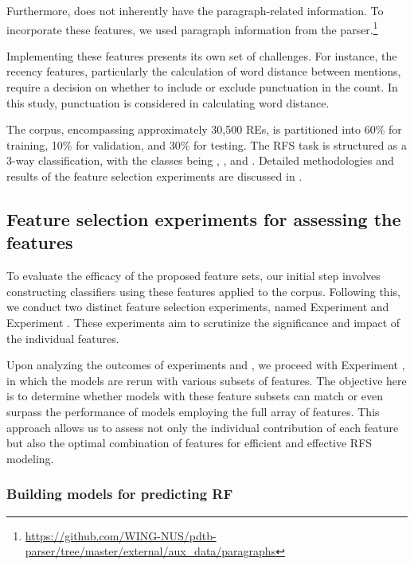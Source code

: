 Furthermore, \wsj does not inherently have the paragraph-related information. To incorporate these features, we used paragraph information from the  parser.\footnote{\url{https://github.com/WING-NUS/pdtb-parser/tree/master/external/aux_data/paragraphs}}

Implementing these features presents its own set of challenges. For instance, the recency features, particularly the calculation of word distance between mentions, require a decision on whether to include or exclude punctuation in the count. In this study, punctuation is considered in calculating word distance.

The \wsj corpus, encompassing approximately 30,500 REs, is partitioned into 60\% for training, 10\% for validation, and 30\% for testing. The RFS task is structured as a 3-way classification, with the classes being , , and . Detailed methodologies and results of the feature selection experiments are discussed in .

\subsection{Feature selection experiments for assessing the features}\label{sec:experiments}

To evaluate the efficacy of the proposed feature sets, our initial step involves constructing classifiers using these features applied to the \wsj corpus. Following this, we conduct two distinct feature selection experiments, named Experiment \expone and Experiment \exptwo. These experiments aim to scrutinize the significance and impact of the individual features.

Upon analyzing the outcomes of experiments \expone and \exptwo, we proceed with Experiment \expthree, in which the models are rerun with various subsets of features. The objective here is to determine whether models with these feature subsets can match or even surpass the performance of models employing the full array of features. This approach allows us to assess not only the individual contribution of each feature but also the optimal combination of features for efficient and effective RFS modeling.


\subsubsection{Building models for predicting RF}\label{subsec:building}

